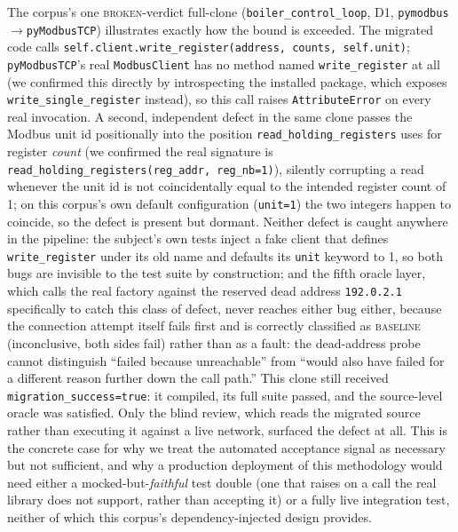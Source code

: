 The corpus's one \textsc{broken}-verdict full-\sys clone (\texttt{boiler\_control\_loop}, D1, \texttt{pymodbus}$\to$\texttt{pyModbusTCP}) illustrates exactly how the bound is exceeded. The migrated code calls \texttt{self.client.write\_register(address, counts, self.unit)}; \texttt{pyModbusTCP}'s real \texttt{ModbusClient} has no method named \texttt{write\_register} at all (we confirmed this directly by introspecting the installed package, which exposes \texttt{write\_single\_register} instead), so this call raises \texttt{AttributeError} on every real invocation. A second, independent defect in the same clone passes the Modbus unit id positionally into the position \texttt{read\_holding\_registers} uses for register \emph{count} (we confirmed the real signature is \texttt{read\_holding\_registers(reg\_addr, reg\_nb=1)}), silently corrupting a read whenever the unit id is not coincidentally equal to the intended register count of 1; on this corpus's own default configuration (\texttt{unit=1}) the two integers happen to coincide, so the defect is present but dormant. Neither defect is caught anywhere in the pipeline: the subject's own tests inject a fake client that defines \texttt{write\_register} under its old name and defaults its \texttt{unit} keyword to 1, so both bugs are invisible to the test suite by construction; and the fifth oracle layer, which calls the real factory against the reserved dead address \texttt{192.0.2.1} specifically to catch this class of defect, never reaches either bug either, because the connection attempt itself fails first and is correctly classified as \textsc{baseline} (inconclusive, both sides fail) rather than as a fault: the dead-address probe cannot distinguish ``failed because unreachable'' from ``would also have failed for a different reason further down the call path.'' This clone still received \texttt{migration\_success=true}: it compiled, its full suite passed, and the source-level oracle was satisfied. Only the blind review, which reads the migrated source rather than executing it against a live network, surfaced the defect at all. This is the concrete case for why we treat the automated acceptance signal as necessary but not sufficient, and why a production deployment of this methodology would need either a mocked-but-\emph{faithful} test double (one that raises on a call the real library does not support, rather than accepting it) or a fully live integration test, neither of which this corpus's dependency-injected design provides.

